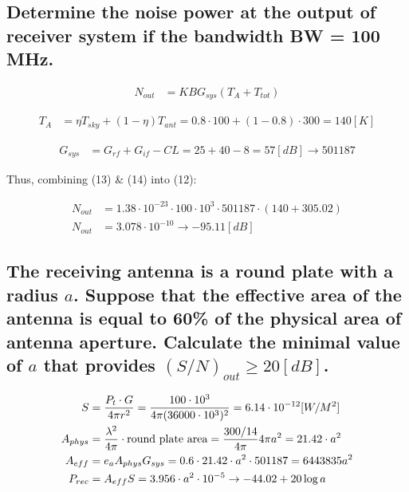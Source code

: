 \documentclass[12pt, letterpaper]{article}
\begin{document}
\subsection{Determine the noise power at the output of receiver system if the bandwidth BW = 100 MHz.}

\begin{align}
  N_{out}
  &=
  KBG_{sys}(T_A+T_{tot})
\end{align}

\begin{align}
  T_A
  &=
  \eta T_{sky}
  +
  (1-\eta)T_{ant}
  =
  0.8\cdot100
  +
  (1-0.8)\cdot 300
  =
  140[K]
\end{align}

\begin{align}
  G_{sys}
  &=
  G_{rf}+G_{if}-CL
  =
  25+40-8
  =
  57[dB]
  \rightarrow
  501187
\end{align}

\vspace{1em}
\begin{center}
  Thus, combining (13) \& (14) into (12):
\end{center}

\begin{align}
  N_{out}
  &=
  1.38\cdot10^{-23}
  \cdot
  100\cdot 10^3
  \cdot
  501187
  \cdot
  (140+305.02)
  \\
  N_{out}
  &=
  3.078\cdot10^{-10}
  \rightarrow
  -95.11[dB]
\end{align}

\subsection{The receiving antenna is a round plate with a radius $a$. Suppose that the effective area of the antenna is equal to 60\% of the physical area of antenna aperture. Calculate the minimal value of $a$ that provides $(S/N)_{out}\ge 20[dB]$.}

\begin{align}
  S
  &=
  {
    P_t\cdot G
    \over
    4\pi r^2
  }
  =
  {
    100\cdot 10^3
    \over
    4\pi (36000\cdot10^3)^2
  }
  =
  6.14\cdot 10^{-12}[W/M^2]
  \\
  A_{phys}
  &=
  {\lambda^2\over 4\pi}\cdot \text{round plate area}
  =
  {300/14\over 4\pi}4\pi a^2
  =
  21.42\cdot a^2
  \\
  A_{eff}
  &=
  e_a
  A_{phys}
  G_{sys}
  =
  0.6
  \cdot
  21.42\cdot a^2
  \cdot
  501187
  =
  6443835 a^2
  \\
  P_{rec}
  &=
  A_{eff}S
  =
  3.956\cdot a^2\cdot 10^{-5}
  \rightarrow
  -44.02+20\log a
\end{align}
\end{document}
